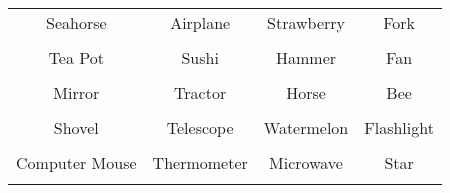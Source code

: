 \documentclass[12pt,a4paper]{article}
\begin{document}
\thispagestyle{empty}
\begin{table}[]
\centering
\Huge
\begin{tabular}{cccc}
 Seahorse& Airplane& Strawberry& Fork\\  & & & \\
 Tea Pot& Sushi& Hammer& Fan\\  & & & \\
 Mirror& Tractor& Horse& Bee\\  & & & \\
 Shovel& Telescope& Watermelon& Flashlight\\  & & & \\
 Computer Mouse& Thermometer& Microwave& Star\\  & & & \\
\end{tabular}
\end{table}
\end{document}
